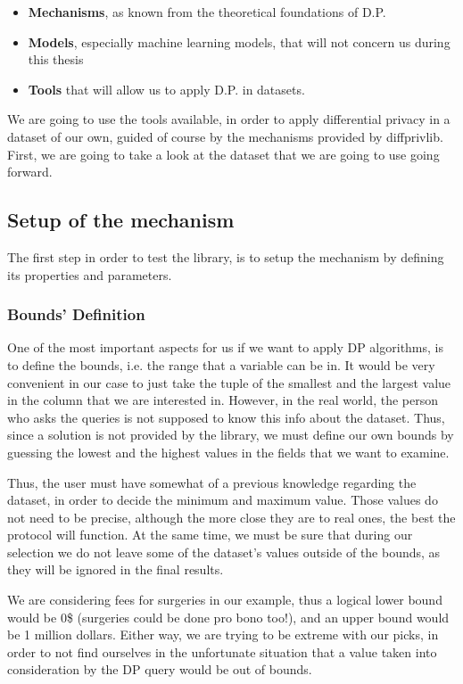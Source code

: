 \begin{itemize}
    \item \textbf{Mechanisms}, as known from the theoretical foundations of D.P.
    \item \textbf{Models}, especially machine learning models, that will not concern us during this thesis
    \item \textbf{Tools} that will allow us to apply D.P. in datasets.
\end{itemize}

We are going to use the tools available, in order to apply differential privacy in a dataset of our own, guided of course by the mechanisms provided by diffprivlib. First, we are going to take a look at the dataset that we are going to use going forward.


\subsection{Setup of the mechanism}

The first step in order to test the library, is to setup the mechanism by defining its properties and parameters. 

\subsubsection{Bounds' Definition}

One of the most important aspects for us if we want to apply DP algorithms, is to define the bounds, i.e. the range that a variable can be in. It would be very convenient in our case to just take the tuple of the smallest and the largest value in the column that we are interested in. However, in the real world, the person who asks the queries is not supposed to know this info about the dataset. Thus, since a solution is not provided by the library, we must define our own bounds by guessing the lowest and the highest values in the fields that we want to examine. 

Thus, the user must have somewhat of a previous knowledge regarding the dataset, in order to decide the minimum and maximum value. Those values do not need to be precise, although the more close they are to real ones, the best the protocol will function. At the same time, we must be sure that during our selection we do not leave some of the dataset's values outside of the bounds, as they will be ignored in the final results. 

We are considering fees for surgeries in our example, thus a logical lower bound would be 0\$ (surgeries could be done pro bono too!), and an upper bound would be 1 million dollars. Either way, we are trying to be extreme with our picks, in order to not find ourselves in the unfortunate situation that a value taken into consideration by the DP query would be out of bounds.

